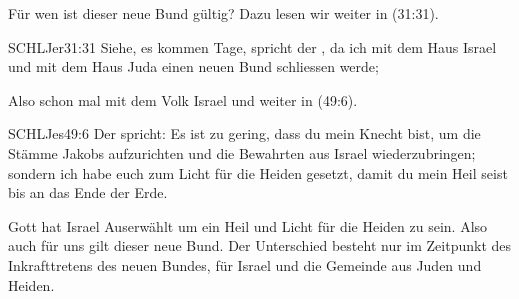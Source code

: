     \begin{otsblock}
        Für wen ist dieser neue Bund gültig? Dazu lesen wir weiter in (31:31).
        \begin{bibelbox}{SCHL}{Jer}{31:31}
           Siehe, es kommen Tage, spricht der \herr{}, da ich mit dem Haus Israel und mit dem Haus Juda einen neuen Bund schliessen werde;
        \end{bibelbox} 
        Also schon mal mit dem Volk Israel und weiter in (49:6).
        \begin{bibelbox}{SCHL}{Jes}{49:6}
           Der \herr{} spricht: Es ist zu gering, dass du mein Knecht bist, um die Stämme Jakobs aufzurichten und die Bewahrten aus Israel wiederzubringen; sondern ich habe euch zum Licht für die Heiden gesetzt, damit du mein Heil seist bis an das Ende der Erde.
        \end{bibelbox}
        Gott hat Israel Auserwählt um ein Heil und Licht für die Heiden zu sein. Also auch für uns gilt dieser neue Bund. Der Unterschied besteht nur im Zeitpunkt des Inkrafttretens des neuen Bundes, für Israel und die Gemeinde aus Juden und Heiden.
    \end{otsblock}
